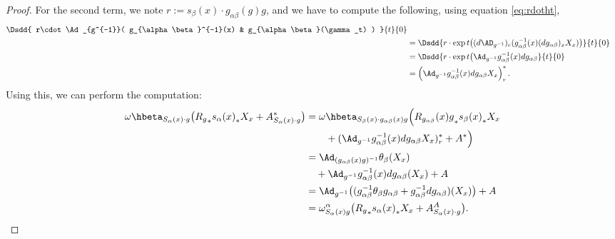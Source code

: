 \begin{proof}
	For the second term, we note $r:=s_{\beta}(x)\cdot g_{\alpha\beta}(g)g$, and we have to compute the following, using equation \eqref{eq:rdotht},
	\begin{equation}
		\begin{aligned}
			\Dsdd{  r\cdot\Ad_{g^{-1}}( g_{\alpha\beta}^{-1}(x) & g_{\alpha\beta}(\gamma_t) ) }{t}{0}                                                                             \\
			                                                    & =\Dsdd{ r\cdot\exp t\big(    (d\AD_{g^{-1}})_e( g_{\alpha\beta}^{-1}(x)(dg_{\alpha\beta})_xX_x )   \big)}{t}{0} \\
			                                                    & =\Dsdd{r\cdot\exp t\big( \Ad_{g^{-1}}g_{\alpha\beta}^{-1}(x)dg_{\alpha\beta}}{t}{0}                             \\
			                                                    & =\left(  \Ad_{g^{-1}}g^{-1}_{\alpha\beta}(x)dg_{\alpha\beta} X_x    \right)^*_r.
		\end{aligned}
	\end{equation}
	Using this, we can perform the computation:
	\begin{equation}
		\begin{aligned}
			\omega\hbeta_{S_{\alpha}(x)\cdot g}\big(  {R_g}_*{s_{\alpha}(x)}_*X_x+A^*_{S_{\alpha}(x)\cdot g}  \big)
			 & =\omega\hbeta_{S_{\beta}(x)\cdot g_{\alpha\beta}(x)g}\Big(  {R_{g_{\alpha\beta}}(x)g}_*{s_{\beta}(x)}_*X_x                   \\
			 & \qquad + (  \Ad_{g^{-1}}g^{-1}_{\alpha\beta}(x)dg_{\alpha\beta} X_x  )^*_r +A^* \Big)                                        \\
			 & =\Ad_{(g_{\alpha\beta}(x)g)^{-1}}\theta_{\beta}(X_x)                                                                         \\
			 & \quad+\Ad_{g^{-1}}g_{\alpha\beta}^{-1}(x)dg_{\alpha\beta}(X_x)+A                                                             \\
			 & =\Ad_{g^{-1}}\big(  (g_{\alpha\beta}^{-1}\theta_{\beta} g_{\alpha\beta}+g_{\alpha\beta}^{-1} dg_{\alpha\beta})(X_x)  \big)+A \\
			 & =\omega^{\alpha}_{S_{\alpha}(x)g}\big( {R_g}_*{s_{\alpha}(x)}_*X_x+A^A_{S_{\alpha}(x)\cdot g} \big).
		\end{aligned}
	\end{equation}

\end{proof}

